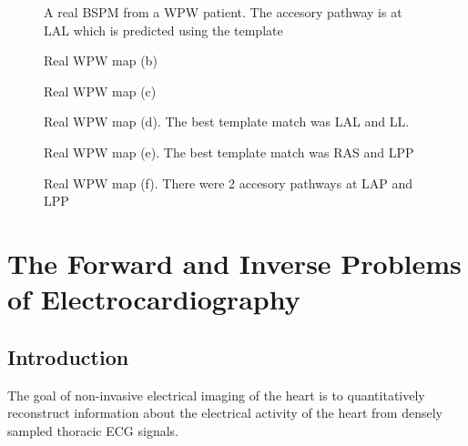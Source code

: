 \begin{figure}[htbp] \centering
  \caption[Real BSPM WPW map (a)]{A real BSPM from a WPW patient.  The accesory
    pathway is at LAL which is predicted using the template }
  \label{fig:hal-bspm-wpw1}
\end{figure}

\begin{figure}[htbp] \centering
  \caption[Real BSPM WPW map (b)]{Real WPW map (b) }
  \label{fig:hal-bspm-wpw2}
\end{figure}

\begin{figure}[htbp] \centering
  \caption[Real BSPM WPW map (c)]{Real WPW map (c) }
  \label{fig:hal-bspm-wpw3}
\end{figure}

\begin{figure}[htbp] \centering
  \caption[Real BSPM WPW map (d)]{Real WPW map (d). The best template match was
    LAL and LL. }
  \label{fig:hal-bspm-wpw4}
\end{figure}

\begin{figure}[htbp] \centering
  \caption[Real BSPM WPW map (e)]{Real WPW map (e).  The best template match was
   RAS and LPP}
  \label{fig:hal-bspm-wpw5}
\end{figure}

\begin{figure}[htbp] \centering
  \caption[Real BSPM WPW map (f)]{Real WPW map (f).  There were 2 accesory
    pathways  at LAP and LPP }
  \label{fig:hal-bspm-wpw6}
\end{figure}

\section{The Forward and Inverse Problems of Electrocardiography}
\subsection{Introduction}
\enlargethispage{-\baselineskip}
\enlargethispage{-\baselineskip}
\enlargethispage{-\baselineskip}
The goal of non-invasive electrical imaging of the heart is to
quantitatively reconstruct information about the electrical activity
of the heart from densely sampled thoracic ECG signals. 


